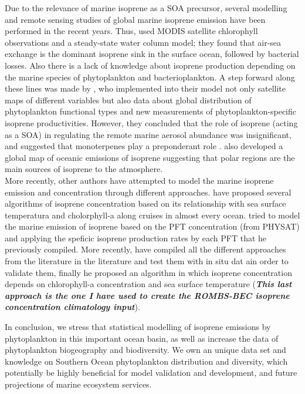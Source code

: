 \documentclass[draft,linenumbers]{agujournal}
\begin{document}
Due to the relevance of marine isoprene as a SOA precursor, several modelling and remote sensing studies of global marine isoprene emission have been performed in the recent years. Thus, \citep{palmer2005quantifying} used MODIS satellite chlorophyll observations and a steady-state water column model; they found that air-sea exchange is the dominant isoprene sink in the surface ocean, followed by bacterial losses. Also there is a lack of knowledge about isoprene production depending on the marine species of phytoplankton and bacterioplankton. A step forward along these lines was made by \citep{arnold2009evaluation}, who implemented into their model not only satellite maps of different variables but also data about global distribution of phytoplankton functional types and new measurements of phytoplankton-specific isoprene productivities. However, they concluded that the role of isoprene (acting as a SOA) in regulating the remote marine aerosol abundance was insignificant, and suggested that monoterpenes play a preponderant role \citep{yassaa2008evidence}. \citep{luo2010numerical} also developed a global map of oceanic emissions of isoprene suggesting that polar regions are the main sources of isoprene to the atmosphere.\\

More recently, other authors have attempted to model the marine isoprene emission and concentration through different approaches. \citep{ooki2015global} have proposed several algorithms of isoprene concentration based on its relationship with sea surface temperatura and cholorphyll-a along cruises in almost every ocean. \citep{booge2016can} tried to model the marine emission of isoprene based on the PFT concentration (from PHYSAT) and applying the speficic isoprene production rates by each PFT that he previously compiled. More recently, \citep{hackenberg2017potential} have compiled all the different approaches from the literature in the literature and test them with in situ dat ain order to validate them, finally he proposed an algorithm in which isoprene concentration depends on chlorophyll-a concentration and sea surface temperature (\textit{\textbf{This last approach is the one I have used to create the ROMBS-BEC isoprene concentration climatology input}}).

 In conclusion, we stress that statistical modelling of isoprene emissions by phytoplankton  in this important ocean basin, as well as increase the data of phytoplankton biogeography and biodiversity. We own an unique data set and knowledge on Southern Ocean phytoplankton distribution and diversity, which potentially be highly beneficial for model validation and development, and future projections of marine ecosystem services.\\
\end{document}

